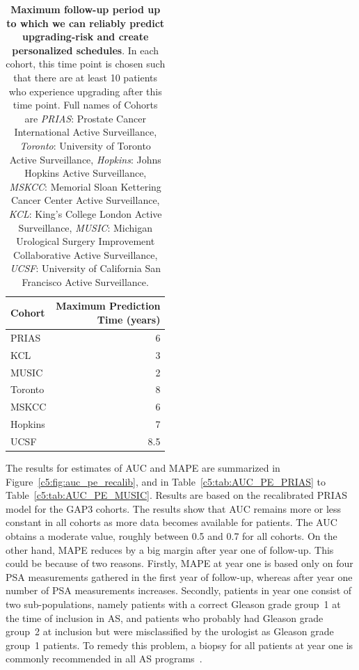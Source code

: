 \begin{subappendices}
\begin{table}
\small
\centering
\caption{\textbf{Maximum follow-up period up to which we can reliably predict upgrading-risk and create personalized schedules}. In each cohort, this time point is chosen such that there are at least 10 patients who experience upgrading after this time point. Full names of Cohorts are \textit{PRIAS}: Prostate Cancer International Active Surveillance, \textit{Toronto}: University of Toronto Active Surveillance, \textit{Hopkins}: Johns Hopkins Active Surveillance, \textit{MSKCC}: Memorial Sloan Kettering Cancer Center Active Surveillance, \textit{KCL}: King's College London Active Surveillance, \textit{MUSIC}: Michigan Urological Surgery Improvement Collaborative Active Surveillance, \textit{UCSF}: University of California San Francisco Active Surveillance.}
\label{c5:tab:max_pred_time}
\begin{tabular}{l|r}
\hline
\hline
Cohort & \parbox[t]{3.5cm}{Maximum Prediction\\Time (years)}\\
\hline
PRIAS & 6\\
KCL & 3\\
MUSIC & 2\\
Toronto & 8\\
MSKCC & 6\\
Hopkins & 7\\
UCSF & 8.5\\
\hline
\end{tabular}    
\end{table}

The results for estimates of AUC and MAPE are summarized in Figure~\ref{c5:fig:auc_pe_recalib}, and in Table~\ref{c5:tab:AUC_PE_PRIAS} to Table~\ref{c5:tab:AUC_PE_MUSIC}. Results are based on the recalibrated PRIAS model for the GAP3 cohorts. The results show that AUC remains more or less constant in all cohorts as more data becomes available for patients. The AUC obtains a moderate value, roughly between 0.5 and 0.7 for all cohorts. On the other hand, MAPE reduces by a big margin after year one of follow-up. This could be because of two reasons. Firstly, MAPE at year one is based only on four PSA measurements gathered in the first year of follow-up, whereas after year one number of PSA measurements increases. Secondly, patients in year one consist of two sub-populations, namely patients with a correct Gleason grade group~1 at the time of inclusion in AS, and patients who probably had Gleason grade group~2 at inclusion but were misclassified by the urologist as Gleason grade group~1 patients. To remedy this problem, a biopsy for all patients at year one is commonly recommended in all AS programs~\citep{bokhorst2015compliance}.


\end{subappendices}

